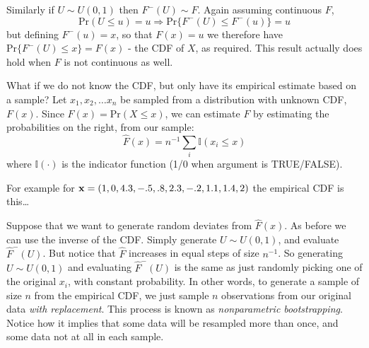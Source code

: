 \documentclass[10pt] {article}
\newcommand{\eps}[3]
{{\begin{center}
 \rotatebox{#1}{\scalebox{#2}{\texttt{[image: \#3]}}}
 \end{center}}
}
\theoremstyle{definition}
\begin{document}
Similarly if $U \sim U(0,1)$ then $F^-(U) \sim F$. Again assuming continuous $F$, 
$$
\text{Pr}(U\le u) = u \Rightarrow \text{Pr}\{F^-(U)\le F^-(u)\} = u 
$$
but defining $F^-(u) = x$, so that $F(x)=u$ we therefore have $\text{Pr}\{F^-(U)\le x\} = F(x)$ - the CDF of $X$, as required. This result actually does hold when $F$ is not continuous as well. 

What if we do not know the CDF, but only have its empirical estimate based on a sample? Let $x_1, x_2, \ldots x_n$ be sampled from a distribution with unknown CDF, $F(x)$. Since $F(x) = \text{Pr}(X \le x)$, we can estimate $F$ by estimating the probabilities on the right, from our sample:
$$
\hat F(x) = n^{-1} \sum_i \mathbb{I}(x_i\le x)
$$
where $\mathbb{I}(\cdot)$ is the indicator function (1/0 when argument is TRUE/FALSE). 

For example for  ${\bf x} = (1, 0, 4.3, -.5, .8, 2.3, -.2, 1.1, 1.4, 2)$ the empirical CDF is this\ldots

\eps{-90}{.5}{ecdf-bs.eps}

Suppose that we want to generate random deviates from $ \hat F(x) $. As before we can use the inverse of the CDF. Simply generate $U \sim U(0,1)$, and evaluate $ \hat F^-(U) $. But notice that $\hat F$ increases in equal steps of size $n^{-1}$. So generating $U \sim U(0,1)$ and evaluating $ \hat F^-(U) $ is the same as just randomly picking one of the original $x_i$, with constant probability. In other words, to generate a sample of size $n$ from the empirical CDF, we just sample $n$ observations from our original data {\em with replacement}. This process is known as {\em nonparametric bootstrapping}. Notice how it implies that some data will be resampled more than once, and some data not at all in each sample. 
\end{document}
